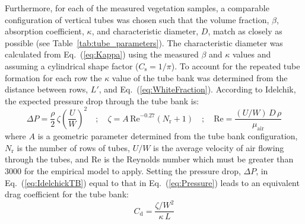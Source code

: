\documentclass[12pt]{article}
\begin{document}
Furthermore, for each of the measured vegetation samples, a comparable configuration of vertical tubes was chosen such that the volume fraction, $\beta$, absorption coefficient, $\kappa$, and characteristic diameter, $D$, match as closely as possible (see Table~\ref{tab:tube_parameters}). The characteristic diameter was calculated from Eq.~(\ref{eq:Kappa}) using the measured $\beta$ and $\kappa$ values and assuming a cylindrical shape factor ($C_{\mathrm{s}} = 1/\pi$). To account for the repeated tube formation for each row the $\kappa$ value of the tube bank was determined from the distance between rows, $L'$, and Eq.~(\ref{eq:WhiteFraction}). According to Idelchik, the expected pressure drop through the tube bank is:
\begin{equation}
\label{eq:IdelchickTB}
\Delta P = \frac{\rho}{2}\, \zeta  \left( \frac{U}{W} \right)^2  \quad ; \quad \zeta = A \, \mathrm{Re}^{-0.27} (N_\mathrm{r}+1) \quad ; \quad  \mathrm{Re} = \frac{(U/W) \, D \, \rho}{\mu_\mathrm{air}}
\end{equation}
where $A$ is a geometric parameter determined from the tube bank configuration, $N_\mathrm{r}$ is the number of rows of tubes, $U/W$ is the average velocity of air flowing through the tubes, and Re is the Reynolds number which must be greater than 3000 for the empirical model to apply. Setting the pressure drop, $\Delta P$, in Eq.~(\ref{eq:IdelchickTB}) equal to that in Eq.~(\ref{eq:Pressure}) leads to an equivalent drag coefficient for the tube bank:
\begin{equation}
   C_\mathrm{d} = \frac{\zeta/W^2}{\kappa \, L}
\end{equation}
\end{document}
